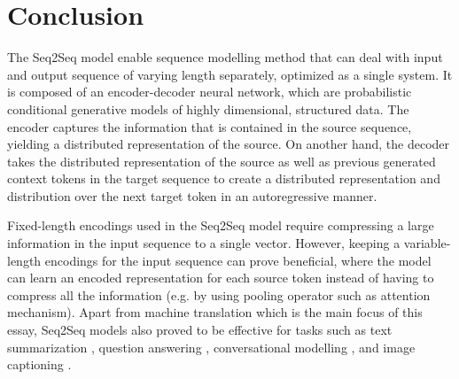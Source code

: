 \documentclass[12pt]{extarticle}
\begin{document}




\section*{Conclusion}
The Seq2Seq model enable sequence modelling method that can deal with input and output sequence of varying length separately, optimized as a single system. It is composed of an encoder-decoder neural network, which are probabilistic conditional generative models of highly dimensional, structured data. The encoder captures the information that is contained in the source sequence, yielding a distributed representation of the source. On another hand, the decoder takes the distributed representation of the source as well as previous generated context tokens in the target sequence to create a distributed representation and distribution over the next target token in an autoregressive manner.

Fixed-length encodings used in the Seq2Seq model require compressing a large information in the input sequence to a single vector. However, keeping a variable-length encodings for the input sequence can prove beneficial, where the model can learn an encoded representation for each source token instead of having to compress all the information (e.g. by using pooling operator such as attention mechanism). Apart from machine translation which is the main focus of this essay, Seq2Seq models also proved to be effective for tasks such as text summarization \citep{nallapati-etal-2016-abstractive}, question answering \citep{yin-etal-2016-neural-generative}, conversational modelling \citep{DBLP:journals/corr/VinyalsL15}, and image captioning \citep{pmlr-v37-xuc15, show-and-tell}. 


\newpage

\end{document}
